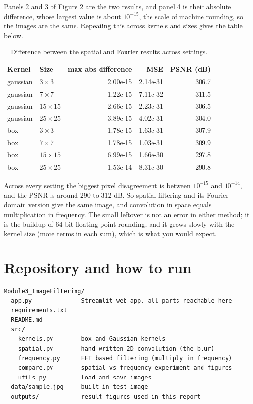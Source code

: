 \documentclass[11pt]{article}
\begin{document}
Panels 2 and 3 of Figure 2 are the two results, and panel 4 is their absolute
difference, whose largest value is about $10^{-15}$, the scale of machine
rounding, so the images are the same. Repeating this across kernels and sizes
gives the table below.

\begin{table}[h]
\centering
\begin{tabular}{llrrr}
\toprule
Kernel & Size & max abs difference & MSE & PSNR (dB) \\
\midrule
gaussian & $3\times3$   & 2.00e-15 & 2.14e-31 & 306.7 \\
gaussian & $7\times7$   & 1.22e-15 & 7.11e-32 & 311.5 \\
gaussian & $15\times15$ & 2.66e-15 & 2.23e-31 & 306.5 \\
gaussian & $25\times25$ & 3.89e-15 & 4.02e-31 & 304.0 \\
box      & $3\times3$   & 1.78e-15 & 1.63e-31 & 307.9 \\
box      & $7\times7$   & 1.78e-15 & 1.03e-31 & 309.9 \\
box      & $15\times15$ & 6.99e-15 & 1.66e-30 & 297.8 \\
box      & $25\times25$ & 1.53e-14 & 8.31e-30 & 290.8 \\
\bottomrule
\end{tabular}
\caption{Difference between the spatial and Fourier results across settings.}
\end{table}

Across every setting the biggest pixel disagreement is between $10^{-15}$ and
$10^{-14}$, and the PSNR is around 290 to 312 dB. So spatial filtering and its
Fourier domain version give the same image, and convolution in space equals
multiplication in frequency. The small leftover is not an error in either method;
it is the buildup of 64 bit floating point rounding, and it grows slowly with the
kernel size (more terms in each sum), which is what you would expect.

\section{Repository and how to run}

\begin{verbatim}
Module3_ImageFiltering/
  app.py              Streamlit web app, all parts reachable here
  requirements.txt
  README.md
  src/
    kernels.py        box and Gaussian kernels
    spatial.py        hand written 2D convolution (the blur)
    frequency.py      FFT based filtering (multiply in frequency)
    compare.py        spatial vs frequency experiment and figures
    utils.py          load and save images
  data/sample.jpg     built in test image
  outputs/            result figures used in this report
\end{verbatim}
\end{document}
